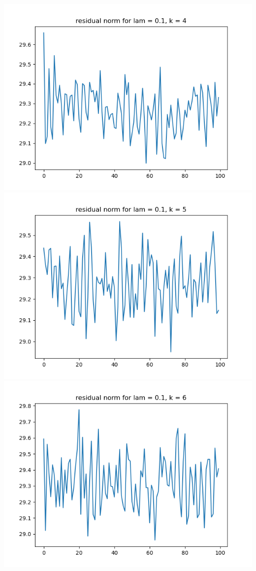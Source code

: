 \documentclass{article}
\begin{document}
\begin{enumerate}
\begin{enumerate}
\begin{center}
			\includegraphics[scale=.3]{hw7p1 residual norm for lamcount = 1, k = 4}
			\includegraphics[scale=.3]{hw7p1 residual norm for lamcount = 1, k = 5}
			\includegraphics[scale=.3]{hw7p1 residual norm for lamcount = 1, k = 6}

\end{center}
\end{enumerate}
\end{enumerate}
\end{document}
